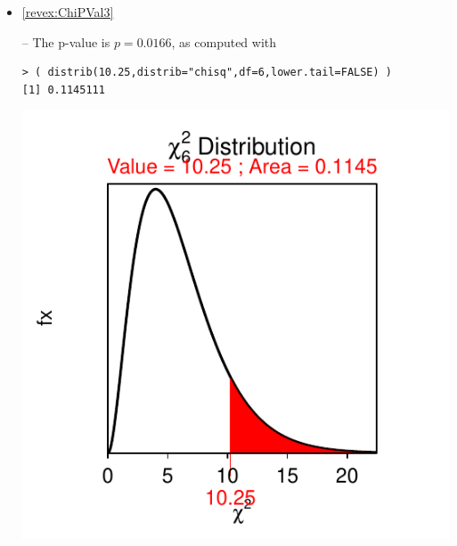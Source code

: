 \documentclass[10pt,openany]{book}\usepackage[]{graphicx}\usepackage[]{color}
\makeatletter
\newenvironment{kframe}{%
 \def\at@end@of@kframe{}%
 \ifinner\ifhmode%
  \def\at@end@of@kframe{\end{minipage}}%
  \begin{minipage}{\columnwidth}%
 \fi\fi%
 \def\FrameCommand##1{\hskip\@totalleftmargin \hskip-\fboxsep
 \colorbox{shadecolor}{##1}\hskip-\fboxsep
     \hskip-\linewidth \hskip-\@totalleftmargin \hskip\columnwidth}%
 \MakeFramed {\advance\hsize-\width
   \@totalleftmargin\z@ \linewidth\hsize
   \@setminipage}}%
 {\par\unskip\endMakeFramed%
 \at@end@of@kframe}
\newenvironment{knitrout}{}{} %
\makeatother
\begin{document}
\begin{itemize}
\begin{knitrout}
{}



\end{knitrout}
  \item \hypertarget{ans:ChiPVal3}{\ref{revex:ChiPVal3}} -- The p-value is $p=0.0166$, as computed with
\begin{knitrout}
\color{fgcolor}\begin{kframe}
\begin{verbatim}
> ( distrib(10.25,distrib="chisq",df=6,lower.tail=FALSE) )
[1] 0.1145111
\end{verbatim}
\end{kframe}

{\centering \includegraphics[width=.4\linewidth]{Figs/unnamed-chunk-398-1} 

}



\end{knitrout}


\end{itemize}
\end{document}
